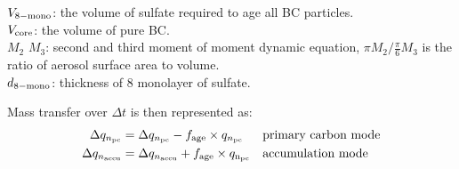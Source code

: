 \documentclass{article}
\begin{document}
\begin{flushleft}
$V_{\rm{8-mono}}$: the volume of sulfate required to age all BC particles. \\
$V_{\rm{core}}$: the volume of pure BC. \\
$M_2$ $M_3$: second and third moment of  moment dynamic equation, $\pi M_2/ \frac{\pi}{6}M_3$ is the ratio of aerosol surface area to volume. \\
$d_{\rm{8-mono}}$: thickness of 8 monolayer of sulfate.
\end{flushleft}

Mass transfer over $\Delta t$ is then represented as:
\begin{align}
\Delta q_{n_{\rm{pc}}} &= \Delta q_{n_{\rm{pc}}} - f_{\rm{age}} \times q_{n_{\rm{pc}}}  &&\text{primary carbon mode} \\
\Delta q_{n_{\rm{accu}}} &= \Delta q_{n_{\rm{accu}}} + f_{\rm{age}} \times q_{\rm{n_{\rm{pc}}}}  &&\text{accumulation mode}
\end{align}



\end{document}
